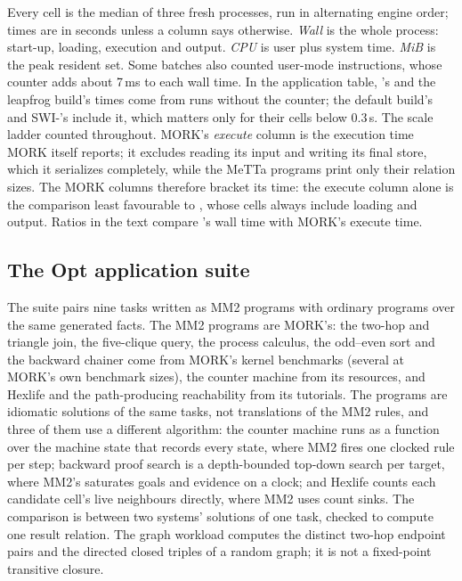 \noindent Every cell is the median of three fresh processes, run in
alternating engine order; times are in seconds unless a column says
otherwise.  \emph{Wall} is the whole process: start-up,
loading, execution and output.  \emph{CPU} is user plus system time.
\emph{MiB} is the peak resident set.  Some batches also counted user-mode
instructions, whose counter adds about 7\,ms to each wall time.  In the
application table, \CeTTa{}'s and the leapfrog build's times come from runs
without the counter; the default build's and SWI-\PeTTa{}'s include it, which
matters only for their cells below 0.3\,s.  The scale ladder counted
throughout.  MORK's
\emph{execute} column is the
execution time MORK itself reports; it excludes reading its input and writing
its final store, which it serializes completely, while the MeTTa programs print
only their relation sizes.  The MORK columns therefore bracket its time: the
execute column alone is the comparison least favourable to \CeTTa{}, whose
cells always include loading and output.  Ratios in the text compare
\CeTTa{}'s wall time with MORK's execute time.

\subsection{The Opt application suite}
\label{app:runtimes-opt}

The suite pairs nine tasks written as MM2 programs with ordinary \PeTTa{}
programs over the same generated facts.  The MM2 programs are MORK's: the
two-hop and triangle join, the five-clique query, the process calculus, the
odd--even sort and the backward chainer  come from MORK's kernel
benchmarks (several at MORK's own benchmark sizes), the counter machine from
its resources, and Hexlife and the path-producing reachability from its
tutorials.  The \PeTTa{} programs are idiomatic solutions of the same tasks,
not translations of the MM2 rules, and three of them use a different
algorithm: the counter machine runs as a function over the machine state that
records every state, where MM2 fires one clocked rule per step; backward proof
search is a depth-bounded top-down search per target, where MM2's 
saturates goals and evidence on a clock; and Hexlife counts each candidate
cell's live neighbours directly, where MM2 uses count sinks.  The comparison is
between two systems' solutions of one task, checked to compute one result
relation.  The graph workload computes the distinct two-hop endpoint pairs and
the directed closed triples of a random graph; it is not a fixed-point
transitive closure.

